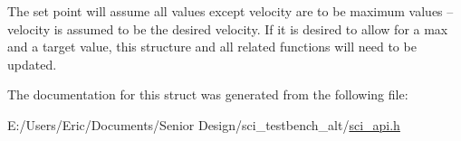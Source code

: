 The set point will assume all values except velocity are to be maximum values -- velocity is assumed to be the desired velocity. If it is desired to allow for a max and a target value, this structure and all related functions will need to be updated. 

The documentation for this struct was generated from the following file\+:\begin{DoxyCompactItemize}
\item 
E\+:/\+Users/\+Eric/\+Documents/\+Senior Design/sci\+\_\+testbench\+\_\+alt/\hyperlink{sci__api_8h}{sci\+\_\+api.\+h}\end{DoxyCompactItemize}
